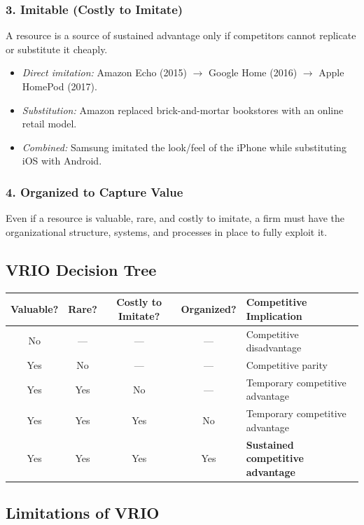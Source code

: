 \documentclass[11pt, letterpaper]{article}
\begin{document}
\subsubsection{3. Imitable (Costly to Imitate)}
A resource is a source of sustained advantage only if competitors cannot replicate or substitute it cheaply.

\begin{itemize}[leftmargin=*]
  \item \textit{Direct imitation:} Amazon Echo (2015) $\rightarrow$ Google Home (2016) $\rightarrow$ Apple HomePod (2017).
  \item \textit{Substitution:} Amazon replaced brick-and-mortar bookstores with an online retail model.
  \item \textit{Combined:} Samsung imitated the look/feel of the iPhone while substituting iOS with Android.
\end{itemize}

\subsubsection{4. Organized to Capture Value}
Even if a resource is valuable, rare, and costly to imitate, a firm must have the organizational structure, systems, and processes in place to fully exploit it.

\subsection{VRIO Decision Tree}

\begin{center}
\begin{tabular}{ccccp{4.5cm}}
\toprule
\textbf{Valuable?} & \textbf{Rare?} & \textbf{Costly to Imitate?} & \textbf{Organized?} & \textbf{Competitive Implication} \\
\midrule
No  & ---  & ---  & ---  & Competitive disadvantage \\
Yes & No   & ---  & ---  & Competitive parity \\
Yes & Yes  & No   & ---  & Temporary competitive advantage \\
Yes & Yes  & Yes  & No   & Temporary competitive advantage \\
Yes & Yes  & Yes  & Yes  & \textbf{Sustained competitive advantage} \\
\bottomrule
\end{tabular}
\end{center}

\subsection{Limitations of VRIO}
\end{document}
